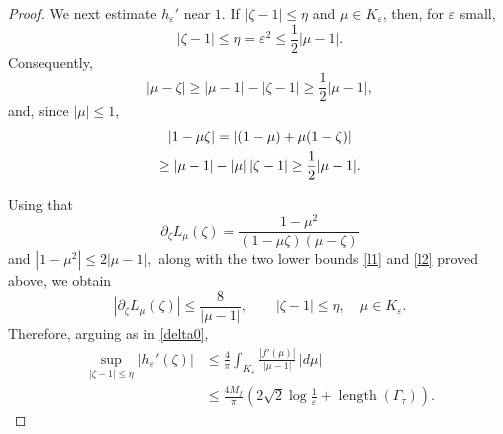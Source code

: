 \documentclass[11pt]{amsart}
\numberwithin{equation}{section}
\theoremstyle{definition}
\theoremstyle{plain}
\begin{document}
\begin{proof}
We next estimate \(h_\varepsilon'\) near \(1\).  If
\(|\zeta-1|\le\eta\) and \(\mu\in K_\varepsilon\), then, for
\(\varepsilon\) small,
\[
        |\zeta-1|\le\eta=\varepsilon^2
        \le \frac12|\mu-1|.
\]
Consequently,
\begin{equation}\label{l1}
        |\mu-\zeta|
        \ge
        |\mu-1|-|\zeta-1|
        \ge
        \frac12|\mu-1|,
\end{equation}
and, since \(|\mu|\le1\),
\begin{gather}\label{l2}
        |1-\mu\zeta|
        =
        |(1-\mu)+\mu(1-\zeta)|  \\
        \ge
        |\mu-1|-|\mu|\,|\zeta-1|
        \ge
        \frac12|\mu-1|.\notag
\end{gather}


Using that
\[
        \partial_\zeta L_\mu(\zeta)
        =
        \frac{1-\mu^2}{(1-\mu\zeta)(\mu-\zeta)}
\]
and
\(
        |1-\mu^2|
        \le
        2|\mu-1|, 
\)
along with the two lower bounds \eqref{l1} and \eqref{l2} proved above, we obtain
\[
        |\partial_\zeta L_\mu(\zeta)|
        \le
        \frac{8}{|\mu-1|},
        \qquad
        |\zeta-1|\le\eta,\quad \mu\in K_\varepsilon.
\]
Therefore, arguing as in \eqref{delta0},
\[
\begin{aligned}
   \sup_{|\zeta-1|\le\eta}|h_\varepsilon'(\zeta)|
   &\le
   \frac4\pi
   \int_{K_\varepsilon}
        \frac{|f'(\mu)|}{|\mu-1|}\,|d\mu| \\
   &\le
   \frac{4M_f}{\pi}
   \left(
      2\sqrt2\log\frac1\varepsilon
      +
      \operatorname{length}(\Gamma_\tau)
   \right).
\end{aligned}
\]



\end{proof}
\end{document}
